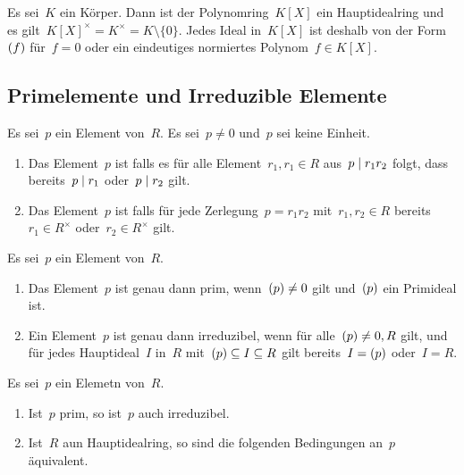 \begin{example}
  Es sei~$K$ ein Körper.
  Dann ist der Polynomring~$K[X]$ ein Hauptidealring und es gilt~$K[X]^\times = K^\times = K \setminus \{0\}$.
  Jedes Ideal in~$K[X]$ ist deshalb von der Form~$(f)$ für~$f = 0$ oder ein eindeutiges normiertes Polynom~$f \in K[X]$.
\end{example}



\subsection{Primelemente und Irreduzible Elemente}

\begin{definition}
  Es sei~$p$ ein Element von~$R$.
  Es sei~$p \neq 0$ und~$p$ sei keine Einheit.
  \begin{enumerate}
    \item
      Das Element~$p$ ist  falls es für alle Element~$r_1, r_1 \in R$ aus~$p \mid r_1 r_2$ folgt, dass bereits~$p \mid r_1$ oder~$p \mid r_2$ gilt.
    \item
      Das Element~$p$ ist  falls für jede Zerlegung~$p = r_1 r_2$ mit~$r_1, r_2 \in R$ bereits~$r_1 \in R^\times$ oder~$r_2 \in R^\times$ gilt.
  \end{enumerate}
\end{definition}


\begin{proposition}
  Es sei~$p$ ein Element von~$R$.
  \begin{enumerate}
    \item
      Das Element~$p$ ist genau dann prim, wenn~$(p) \neq 0$ gilt und~$(p)$ ein Primideal ist.
    \item
      Ein Element~$p$ ist genau dann irreduzibel, wenn für alle~$(p) \neq 0, R$ gilt, und für jedes Hauptideal~$I$ in~$R$ mit~$(p) \subseteq I \subseteq R$ gilt bereits~$I = (p)$ oder~$I = R$.
  \end{enumerate}
\end{proposition}

\begin{proposition}
  Es sei~$p$ ein Elemetn von~$R$.
  \begin{enumerate}
    \item
      Ist~$p$ prim, so ist~$p$ auch irreduzibel.
    \item
      Ist~$R$ aun Hauptidealring, so sind die folgenden Bedingungen an~$p$ äquivalent.
  \end{enumerate}
\end{proposition}



